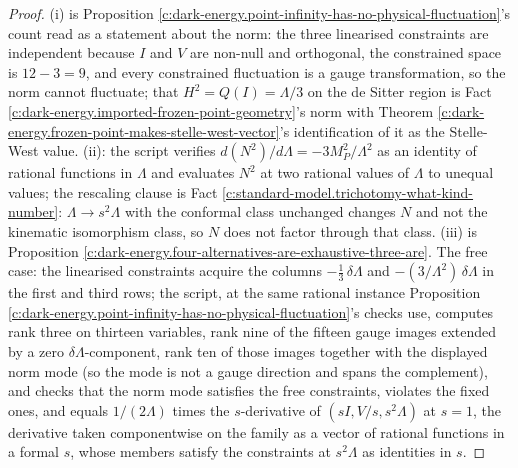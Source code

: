 \documentclass[11pt]{article}
\theoremstyle{definition}
\theoremstyle{plain}
\begin{document}
\begin{proof}
(i) is Proposition \ref{c:dark-energy.point-infinity-has-no-physical-fluctuation}'s count read as a statement about the norm: the three linearised constraints are independent because $I$ and $V$ are non-null and orthogonal, the constrained space is $12 - 3 = 9$, and every constrained fluctuation is a gauge transformation, so the norm cannot fluctuate; that $H^2 = Q(I) = \Lambda/3$ on the de Sitter region is Fact \ref{c:dark-energy.imported-frozen-point-geometry}'s norm with Theorem \ref{c:dark-energy.frozen-point-makes-stelle-west-vector}'s identification of it as the Stelle-West value. (ii): the script verifies $d(N^2)/d\Lambda = -3M_P^2/\Lambda^2$ as an identity of rational functions in $\Lambda$ and evaluates $N^2$ at two rational values of $\Lambda$ to unequal values; the rescaling clause is Fact \ref{c:standard-model.trichotomy-what-kind-number}: $\Lambda \to s^2\Lambda$ with the conformal class unchanged changes $N$ and not the kinematic isomorphism class, so $N$ does not factor through that class. (iii) is Proposition \ref{c:dark-energy.four-alternatives-are-exhaustive-three-are}. The free case: the linearised constraints acquire the columns $-\tfrac13\,\delta\Lambda$ and $-(3/\Lambda^2)\,\delta\Lambda$ in the first and third rows; the script, at the same rational instance Proposition \ref{c:dark-energy.point-infinity-has-no-physical-fluctuation}'s checks use, computes rank three on thirteen variables, rank nine of the fifteen gauge images extended by a zero $\delta\Lambda$-component, rank ten of those images together with the displayed norm mode (so the mode is not a gauge direction and spans the complement), and checks that the norm mode satisfies the free constraints, violates the fixed ones, and equals $1/(2\Lambda)$ times the $s$-derivative of $(sI, V/s, s^2\Lambda)$ at $s = 1$, the derivative taken componentwise on the family as a vector of rational functions in a formal $s$, whose members satisfy the constraints at $s^2\Lambda$ as identities in $s$.

\end{proof}
\end{document}
